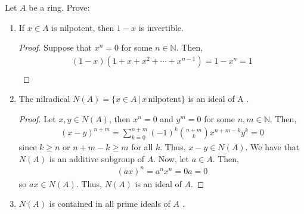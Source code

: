 
\begin{problem}
    Let $A$ be a ring.
    Prove:

    \begin{enumerate}[label=(\theproblem.\arabic*),ref=\theproblem.\arabic*]

        \item \label{itm:1_minus_x_invertible} If $x \in A$ is nilpotent, then $1 - x$ is invertible.
            \begin{sol}
            \begin{proof}
                 Suppose that $x^n=0$ for some $n \in \mathbb{N}$.
                 Then,
                    \begin{align*}
                        (1-x)(1+x+x^2+\cdots+x^{n-1}) = 1-x^{n} = 1 \\
                    \end{align*}
            \end{proof}
            \end{sol}

        \item \label{itm:nilradical_is_ideal} The nilradical $N(A) = \{x \in A \, | \, x \, \text{nilpotent}\}$ is an ideal of A .
            \begin{sol}
            \begin{proof}
                Let $x,y \in N(A)$, then $x^n = 0$ and $y^m = 0$ for some $n,m \in \mathbb{N}$.
                Then,
                    \begin{align*}
                        (x-y)^{n+m} = \sum_{k=0}^{n+m} (-1)^{k} \binom{n+m}{k} x^{n+m-k} y^{k} = 0
                    \end{align*}
                since $k \geq n$ or $n+m-k \geq m$ for all $k$.
                Thus, $x-y \in N(A)$.
                We have that $N(A)$ is an additive subgroup of $A$.
                Now, let $a \in A$.
                Then,
                    \begin{align*}
                        (ax)^n = a^n x^n = 0a = 0
                    \end{align*}
                so $ax \in N(A)$.
                Thus, $N(A)$ is an ideal of $A$.
            \end{proof}
            \end{sol}

        \item \label{itm:nilradical_in_prme} $N(A)$ is contained in all prime ideals of $A$ .
            \begin{sol}


\end{sol}
\end{enumerate}
\end{problem}
